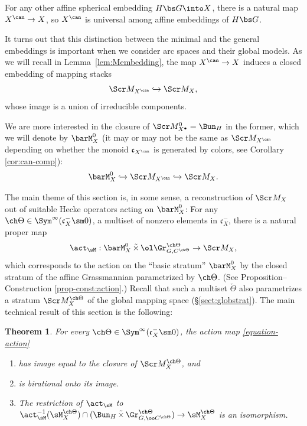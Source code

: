 \documentclass[final]{amsart}
\newtheorem{thm}[subsubsection]{Theorem}
\theoremstyle{remark}
\theoremstyle{definition}
\DeclareMathOperator*{\ttimes}{\tilde\times}
\numberwithin{equation}{section}
\begin{document}
For any other affine spherical embedding $H\bs G\into X$, there is  
a natural map $X^\can \to X$, so $X^\can$ is universal among affine embeddings 
of $H\bs G$. 

It turns out that this distinction between the minimal and the general embeddings is important when we consider arc spaces and their global models. 
As we will recall in Lemma~\ref{lem:Membedding}, the map $X^\can \to X$ induces a closed embedding of mapping stacks 
\[ \Scr M_{X^\can} \hookrightarrow \Scr M_X,\]
whose image is a union of irreducible components.

We are more interested in the closure of $\Scr M^0_{X^\bullet} = \Bun_H$ in the former, which we will denote by $\barM_X^0$ (it may or may not be the same as $\Scr M_{X^\can}$ depending on whether the monoid $\mathfrak c_{X^\can}$ is generated by colors, see Corollary \ref{cor:can-comp}):
\begin{equation}
 \label{cantogeneral}
\barM_X^0 \hookrightarrow \Scr M_{X^\can} \hookrightarrow \Scr M_X.
\end{equation}



The main theme of this section is, in some sense, a reconstruction of $\Scr M_X$ out of suitable Hecke operators acting on $\barM_X^0$: 
For any $\ch\Theta \in \Sym^\infty(\mathfrak c_X^-\sm 0)$, a multiset of nonzero elements in $\mathfrak c_X^-$,
there is a natural proper map 
\begin{equation} \label{equation-action}
\act_\sM : \barM_X^0 \ttimes \ol\Gr^{\ch\Theta}_{G, C^{\ch\Theta}} \to 
\Scr M_X,
\end{equation}
which corresponds to the action on the ``basic stratum'' $\barM_X^0$ by the closed stratum of the affine Grassmannian parametrized by $\ch\Theta$.
(See Proposition--Construction \ref{prop-const:action}.) Recall that such a multiset $\check\Theta$ also parametrizes a stratum $\Scr M^{\ch\Theta}_X$ of the global mapping space (\S \ref{sect:globstrat}). The main technical result of this section is the following:

\begin{thm}
\label{thm:comp}
For every $\ch\Theta \in \Sym^\infty(\mathfrak c_X^- \sm 0)$, the action map \eqref{equation-action} 
\begin{enumerate}
\item has image equal to the closure of $\Scr M^{\ch\Theta}_X$, and  
\item is birational onto its image. 
\item The restriction of $\act_\sM$ to $\act_\sM^{-1}(\sM^{\ch\Theta}_X) \cap 
(\Bun_H \ttimes \Gr^{\ch\Theta}_{G, \oo C^{\ch\Theta}}) \to \sM^{\ch\Theta}_X$ 
is an isomorphism. 
\end{enumerate}
\end{thm}
\end{document}
